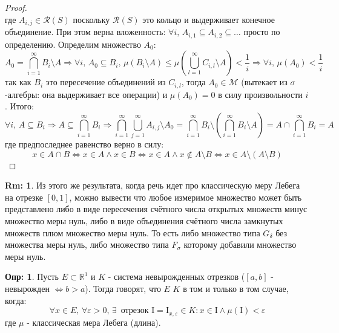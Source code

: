 \documentclass[12pt]{article}
\newcommand{\MR}{\mathbb{R}}
\newcommand{\MI}{\mathrm{I}}
\newcommand{\MCR}{\mathcal{R}}
\newcommand{\MM}{\mathcal{M}}
\newcommand{\VE}{\varepsilon}
\theoremstyle{definition}
\newtheorem{defn}{Опр:}
\newtheorem{rem}{Rm:}
\begin{document}
\begin{proof}
$$	$$ 
	где $A_{i,j} \in \MCR(S)$ поскольку $\MCR(S)$ это кольцо и выдерживает конечное объединение. При этом верна вложенность: $\forall i, \, A_{i,1} \subseteq A_{i,2} \subseteq \dotsc$  просто по определению. Определим множество $A_0$:
	$$
		A_0 = \bigcap\limits_{i = 1}^{\infty}B_i \setminus A \Rightarrow \forall i, \, A_0 \subseteq B_i, \, \mu(B_i \setminus A) \leq \mu\left(\bigcup\limits_{l = 1}^{\infty}C_{i,l} \setminus A\right) < \dfrac{1}{i} \Rightarrow \forall i, \, \mu(A_0) < \dfrac{1}{i}
	$$
	так как $B_i$ это пересечение объединений из $C_{i,l}$, тогда $A_0 \in \MM$ (вытекает из $\sigma$-алгебры: она выдерживает все операции) и $\mu(A_0) = 0$ в силу произвольности $i$. Итого:
	$$
		\forall i, \, A \subseteq B_i \Rightarrow A \subseteq \bigcap\limits_{i = 1}^{\infty}B_i \Rightarrow \bigcap\limits_{i = 1}^{\infty}\bigcup\limits_{j = 1}^{\infty}A_{i,j} \setminus A_0 = \bigcap\limits_{i = 1}^{\infty}B_i \setminus \left(\bigcap\limits_{i = 1}^{\infty}B_i \setminus A \right) = A \cap \bigcap\limits_{i = 1}^{\infty}B_i = A
	$$
	где предпоследнее равенство верно в силу:
	$$	
		x \in A \cap B \Leftrightarrow x \in A \wedge x \in B \Leftrightarrow x \in A \wedge x \not\in A\setminus B \Leftrightarrow x \in A \setminus (A \setminus B)
	$$
\end{proof}

\begin{rem}
	Из этого же результата, когда речь идет про классическую меру Лебега на отрезке $[0,1]$, можно вывести что любое измеримое множество может быть представлено либо в виде пересечения счётного числа открытых множеств минус множество меры нуль, либо в виде объединения счётного числа замкнутых множеств плюм множество меры нуль. То есть либо множество типа $G_\delta$ без множества меры нуль, либо множество типа $F_\sigma$ которому добавили множество меры нуль.
\end{rem}

\begin{defn}
	Пусть $E \subset \MR^1$ и $K$ - система невырожденных отрезков ($[a,b]$ - невырожден $\Leftrightarrow b > a$). Тогда говорят, что $E$  $K$  в том и только в том случае, когда:
	$$
		\forall x \in E, \, \forall \VE > 0, \, \exists \, \text{ отрезок } \MI = \MI_{x,\VE} \in K \colon x \in \MI \wedge \mu(\MI) < \VE
	$$
	где $\mu$ - классическая мера Лебега (длина).
\end{defn}
\end{document}
